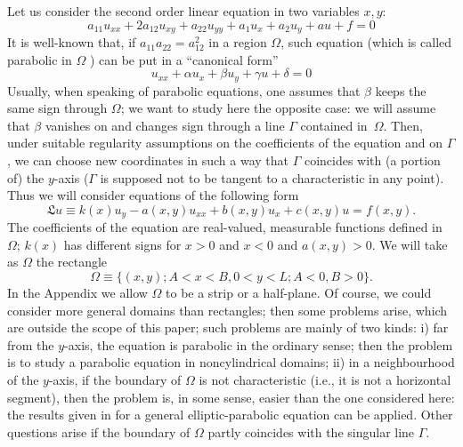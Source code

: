 \documentclass[a4paper,12pt,leqno]{article}
\numberwithin{equation}{section}
\begin{document}
Let us consider the second order linear equation in two variables $x, y$:
\begin{equation*}
	a_{11} u_{x x}+2 a_{12} u_{x y}+a_{22} u_{y y}+a_{1} u_{x}+a_{2} u_{y}+a u+f=0
\end{equation*}
It is well-known that, if $a_{11} a_{22}=a_{12}^{2}$ in a region $\Omega$, such equation (which is called parabolic in $\Omega$ ) can be put in a ``canonical form''
\begin{equation*}
	u_{xx}+\alpha u_{x}+\beta u_{y}+\gamma u+\delta=0
\end{equation*}
Usually, when speaking of parabolic equations, one assumes that $\beta$ keeps the same sign through $\Omega$; we want to study here the opposite case: we will assume that $\beta$ vanishes on and changes sign through a line $\Gamma$ contained in~$\Omega$. Then, under suitable regularity assumptions on the coefficients of the equation and on $\Gamma$, we can choose new coordinates in such a way that $\Gamma$ coincides with (a portion of) the $y$-axis ($\Gamma$ is supposed not to be tangent to a characteristic in any point).
Thus we will consider equations of the following form
\begin{equation} \label{1.1}
	\mathfrak{L}u \equiv k(x) u_{y}-a(x, y) u_{xx}+b(x, y) u_{x}+c(x, y) u=f(x, y).
\end{equation}
The coefficients of the equation are real-valued, measurable functions defined in $\Omega$; $k(x)$ has different signs for $x>0$ and $x<0$ and $a(x, y)>0$.
We will take as $\Omega$ the rectangle
\begin{equation*}
	\Omega \equiv\{(x, y); A<x<B, 0<y<L; A<0, B>0\}.
\end{equation*}
In the Appendix we allow $\Omega$ to be a strip or a half-plane. Of course, we could consider more general domains than rectangles; then some problems arise, which are outside the scope of this paper; such problems are mainly of two kinds: i) far from the $y$-axis, the equation is parabolic in the ordinary sense; then the problem is to study a parabolic equation in noncylindrical domains; ii) in a neighbourhood of the $y$-axis, if the boundary of $\Omega$ is not characteristic (i.e., it is not a horizontal segment), then the problem is, in some sense, easier than the one considered here: the results given in \cite{zbMATH03245768} for a general elliptic-parabolic equation can be applied. Other questions arise if the boundary of $\Omega$ partly coincides with the singular line $\Gamma$.
\end{document}
